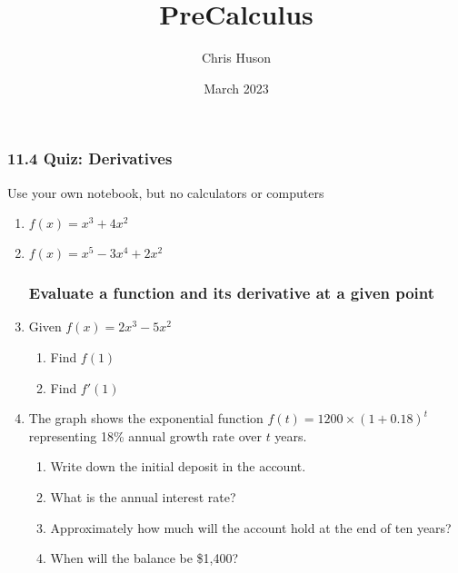 \documentclass[12pt, twoside]{article}
\title{PreCalculus}
\author{Chris Huson}
\date{March 2023}
\begin{document}
\subsubsection*{11.4 Quiz: Derivatives}
Use your own notebook, but no calculators or computers

\begin{enumerate}[itemsep=2cm]

\subsubsection*{State the derivative of a polynomial function}
\item $f(x)=x^3+4x^2$
\item $f(x)=x^5-3x^4+2x^2$ \par \vspace{2cm}

\subsubsection*{Evaluate a function and its derivative at a given point}

\item Given $f(x)=2x^3-5x^2$
\begin{enumerate}[itemsep=2cm]
    \item Find $f(1)$
    \item Find $f'(1)$
\end{enumerate} \vspace{2cm}

\item The graph shows the exponential function $\displaystyle f(t)=1200 \times \left( 1+0.18 \right)^t$ representing 18\% annual growth rate over $t$ years.
\begin{multicols}{2}
    \begin{enumerate}[itemsep=1cm]
        \item Write down the initial deposit in the account.
        \item What is the annual interest rate?
        \item Approximately how much will the account hold at the end of ten years?
        \item When will the balance be \$1,400?
    \end{enumerate}
    \begin{center}
\end{center}
\end{multicols}
\end{enumerate}
\end{document}
